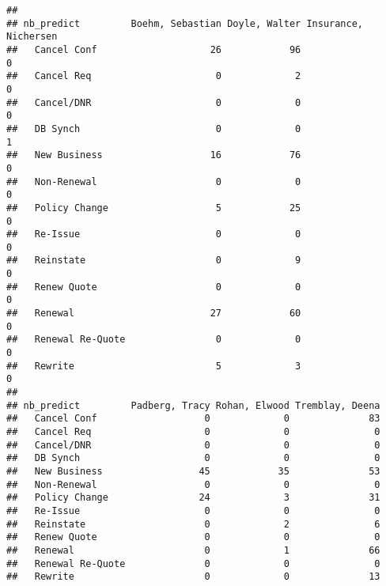 \documentclass[]{article}
\newenvironment{Shaded}{\begin{snugshade}}{\end{snugshade}}
\newcommand{\KeywordTok}[1]{\textcolor[rgb]{0.13,0.29,0.53}{\textbf{#1}}}
\newcommand{\NormalTok}[1]{#1}
\newcommand{\OperatorTok}[1]{\textcolor[rgb]{0.81,0.36,0.00}{\textbf{#1}}}
\begin{document}
\begin{Shaded}
\end{Shaded}

\begin{verbatim}
##                   
## nb_predict         Boehm, Sebastian Doyle, Walter Insurance, Nichersen
##   Cancel Conf                    26            96                    0
##   Cancel Req                      0             2                    0
##   Cancel/DNR                      0             0                    0
##   DB Synch                        0             0                    1
##   New Business                   16            76                    0
##   Non-Renewal                     0             0                    0
##   Policy Change                   5            25                    0
##   Re-Issue                        0             0                    0
##   Reinstate                       0             9                    0
##   Renew Quote                     0             0                    0
##   Renewal                        27            60                    0
##   Renewal Re-Quote                0             0                    0
##   Rewrite                         5             3                    0
##                   
## nb_predict         Padberg, Tracy Rohan, Elwood Tremblay, Deena
##   Cancel Conf                   0             0              83
##   Cancel Req                    0             0               0
##   Cancel/DNR                    0             0               0
##   DB Synch                      0             0               0
##   New Business                 45            35              53
##   Non-Renewal                   0             0               0
##   Policy Change                24             3              31
##   Re-Issue                      0             0               0
##   Reinstate                     0             2               6
##   Renew Quote                   0             0               0
##   Renewal                       0             1              66
##   Renewal Re-Quote              0             0               0
##   Rewrite                       0             0              13
\end{verbatim}

\begin{Shaded}
\end{Shaded}
\end{document}
